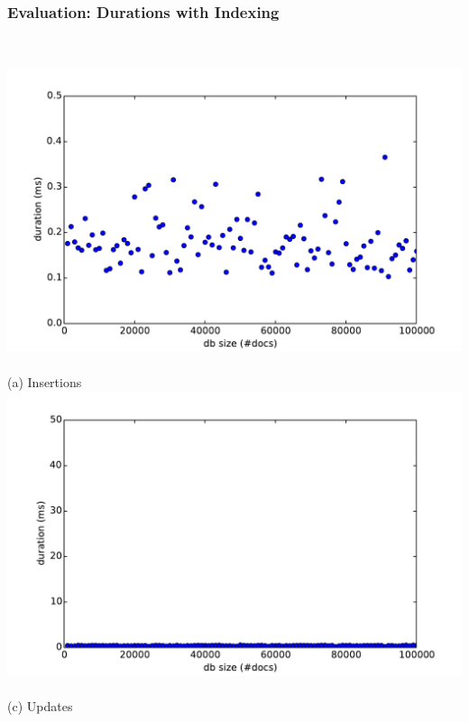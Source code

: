 \begin{frame}
  \frametitle{Evaluation: Durations with Indexing}
  \centering
  \begin{columns}
    \begin{column}{0.55\textwidth}
  \centering
    \small
    \\\vspace{-0.15cm}
    \includegraphics[width=\textwidth]{../thesis/plots/insert-durations-index}\\
    \\\vspace{-0.05cm}
    (a) Insertions
    \\\vspace{-0.1cm}
    \includegraphics[width=\textwidth]{../thesis/plots/update-durations-index}\\
    \\\vspace{-0.05cm}
    (c) Updates
    \end{column}

\end{columns}
\end{frame}
